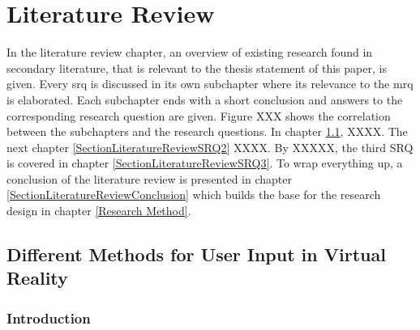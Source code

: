 
\chapter{Literature Review} %

\label{ChapterLiteratureReview} %

In the literature review chapter, an overview of existing research found in secondary literature, that is relevant to the thesis statement of this paper, is given. Every \gls{srq} is discussed in its own subchapter where its relevance to the \gls{mrq} is elaborated. Each subchapter ends with a short conclusion and answers to the corresponding research question are given.
Figure XXX shows the correlation between the subchapters and the research questions. In chapter \ref{SectionLiteratureReviewSRQ1}, XXXX. The next chapter \ref{SectionLiteratureReviewSRQ2} XXXX. By XXXXX, the third SRQ is covered in chapter \ref{SectionLiteratureReviewSRQ3}. To wrap everything up, a conclusion of the literature review is presented in chapter \ref{SectionLiteratureReviewConclusion} which builds the base for the research design in chapter \ref{Research Method}.




\section{Different Methods for User Input in Virtual Reality}

\label{SectionLiteratureReviewSRQ1}

\subsection{Introduction}

